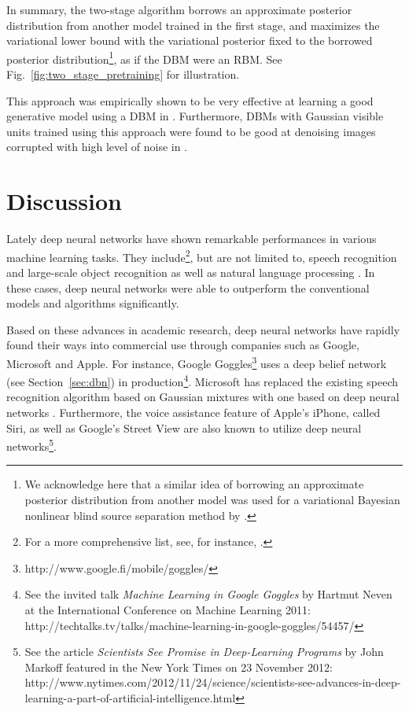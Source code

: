 \documentclass[dissertation,nocontribution,draft*]{aaltoseries}
\begin{document}
In summary, the two-stage algorithm borrows an approximate
posterior distribution from another model trained in the
first stage, and maximizes the variational lower bound with
the variational posterior fixed to the borrowed posterior
distribution\footnote{
We acknowledge here that a similar idea of borrowing an
approximate posterior distribution from another model was
used for a variational Bayesian nonlinear blind source
separation method by \citet{Honkela2004}.
}, as if the DBM were an RBM. See
Fig.~\ref{fig:two_stage_pretraining} for illustration.

This approach was empirically shown to be very effective at
learning a good generative model using a DBM in
. Furthermore, DBMs with Gaussian
visible units trained using this approach were found to be
good at denoising images corrupted with high level of noise
in .













\chapter{Discussion}
\label{chap:discussion}

Lately deep neural networks have shown remarkable
performances in various machine learning tasks. They
include\footnote{For a more comprehensive list, see, for
instance, \citep{Bengio2013pami}.  }, but are not
limited to, speech recognition \citep[see,
e.g.,][]{Hinton2012sp,Dahl2012} and large-scale object
recognition \citep[see, e.g.,][]{Krizhevsky2012,Hinton2012}
as well as natural language processing \citep[see,
e.g.,][]{Socher2011}. In these cases, deep neural networks
were able to outperform the conventional models and
algorithms significantly.

Based on these advances in academic research, deep neural
networks have rapidly found their ways into commercial use
through companies such as Google, Microsoft and Apple.  For
instance, Google Goggles\footnote{
http://www.google.fi/mobile/goggles/ } uses a deep belief
network (see Section~\ref{sec:dbn}) in
production\footnote{See the invited talk \textit{Machine
Learning in Google Goggles} by Hartmut Neven at the
International Conference on Machine Learning 2011:
http://techtalks.tv/talks/machine-learning-in-google-goggles/54457/}.
Microsoft has replaced the existing speech recognition
algorithm based on Gaussian mixtures with one based on deep
neural networks \citep{Deng2013}. Furthermore, the voice
assistance feature of Apple's iPhone, called Siri, as well
as Google's Street View are also known to utilize deep
neural networks\footnote{See the article \textit{Scientists
See Promise in Deep-Learning Programs} by John Markoff
featured in the New York Times on 23 November 2012: \\
http://www.nytimes.com/2012/11/24/science/scientists-see-advances-in-deep-learning-a-part-of-artificial-intelligence.html
}.
\end{document}
